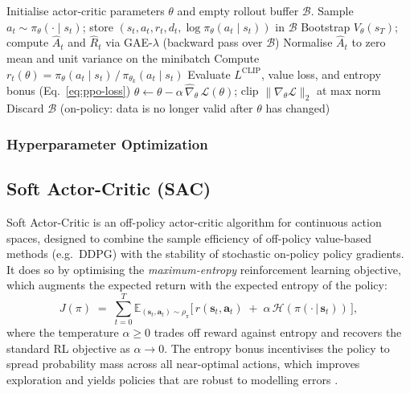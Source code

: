 \documentclass{article}
\begin{document}
\begin{algorithm}[t]
\caption{Proximal Policy Optimization -- PPO-Clip \citep{schulman2017proximal}}
\label{alg:ppo}
\begin{algorithmic}
\State Initialise actor-critic parameters $\theta$ and empty rollout buffer $\mathcal{B}$.
        \State Sample $a_t \sim \pi_\theta(\cdot \mid s_t)$;\; store $(s_t, a_t, r_t, d_t, \log\pi_\theta(a_t \mid s_t))$ in $\mathcal{B}$
    \EndFor
    \State Bootstrap $V_\theta(s_T)$;\; compute $\hat{A}_t$ and $\hat{R}_t$ via GAE-$\lambda$ (backward pass over $\mathcal{B}$)
            \State Normalise $\hat{A}_t$ to zero mean and unit variance on the minibatch
            \State Compute $r_t(\theta) = \pi_\theta(a_t \mid s_t)\,/\,\pi_{\theta_k}(a_t \mid s_t)$
            \State Evaluate $L^{\mathrm{CLIP}}$, value loss, and entropy bonus (Eq.~\ref{eq:ppo-loss})
            \State $\theta \gets \theta - \alpha\,\hat\nabla_\theta\,\mathcal{L}(\theta)$;\; clip $\|\nabla_\theta \mathcal{L}\|_2$ at max norm
        \EndFor
    \EndFor
    \State Discard $\mathcal{B}$ (on-policy: data is no longer valid after $\theta$ has changed)
\EndWhile
\end{algorithmic}
\end{algorithm}
\subsubsection{Hyperparameter Optimization}

\subsection{Soft Actor-Critic (SAC)}
\label{sec:sac}

Soft Actor-Critic \citep{haarnoja2018soft} is an off-policy actor-critic algorithm for continuous action spaces, designed to combine the sample efficiency of off-policy value-based methods (e.g.\ DDPG) with the stability of stochastic on-policy policy gradients. It does so by optimising the \emph{maximum-entropy} reinforcement learning objective, which augments the expected return with the expected entropy of the policy:
\begin{equation}
    J(\pi) \;=\; \sum_{t=0}^{T} \mathbb{E}_{(\mathbf{s}_t,\mathbf{a}_t)\sim \rho_\pi}
    \Big[\, r(\mathbf{s}_t,\mathbf{a}_t) \;+\; \alpha\,\mathcal{H}\!\left(\pi(\cdot\,|\,\mathbf{s}_t)\right) \,\Big],
    \label{eq:sac-objective}
\end{equation}
where the temperature $\alpha \ge 0$ trades off reward against entropy and recovers the standard RL objective as $\alpha \to 0$. The entropy bonus incentivises the policy to spread probability mass across all near-optimal actions, which improves exploration and yields policies that are robust to modelling errors \citep{ziebart2010thesis,haarnoja2017energy}.
\end{document}
